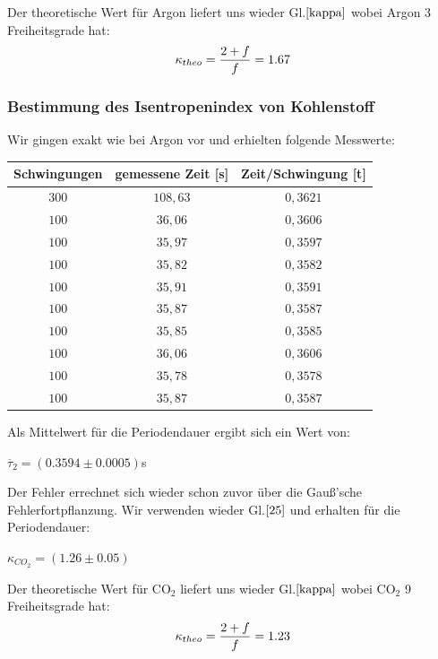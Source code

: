 \documentclass{article}
\begin{document}
{{Der theoretische Wert für Argon liefert uns wieder Gl.\(\eqref{kappa}\) wobei Argon 3 Freiheitsgrade hat:
\begin{equation}
\notag
\kappa_{theo} = \frac{2+f}{f} = 1.67
\end{equation}

\subsubsection{Bestimmung des Isentropenindex von Kohlenstoff}
Wir gingen exakt wie bei Argon vor und erhielten folgende Messwerte:
\begin{center}
\begin{tabular}{c|c|c}
Schwingungen & gemessene Zeit [s]& Zeit/Schwingung [t]\\
\hline 
\(300\)	& \(108,63\) & \(0,3621\)\\
\(100\)	& \(36,06\)	& \(0,3606\)\\
\(100\)	& \(35,97\)	& \(0,3597\)\\
\(100\)	& \(35,82\)	& \(0,3582\)\\
\(100\)	& \(35,91\)	& \(0,3591\)\\
\(100\)	& \(35,87\)	& \(0,3587\)\\
\(100\)	& \(35,85\)	& \(0,3585\)\\
\(100\)	& \(36,06\)	& \(0,3606\)\\
\(100\)	& \(35,78\)	& \(0,3578\)\\
\(100\)	& \(35,87\)	& \(0,3587\)\\
\end{tabular}
\end{center}

\vspace{1cm}

Als Mittelwert für die Periodendauer ergibt sich ein Wert von:
\begin{center}
\(\overline{\tau}_{2} = (0.3594 \pm 0.0005)\)s
\end{center}

Der Fehler errechnet sich wieder schon zuvor über die Gauß'sche Fehlerfortpflanzung.
Wir verwenden wieder Gl.\(\eqref{25}\) und erhalten für die Periodendauer:
\begin{center}
\(\kappa_{CO_2} = (1.26 \pm 0.05)\)
\end{center}

Der theoretische Wert für CO\(_2\) liefert uns wieder Gl.\(\eqref{kappa}\) wobei CO\(_2\) 9 Freiheitsgrade hat:
\begin{equation}
\notag
\kappa_{theo} = \frac{2+f}{f} = 1.23
\end{equation}

}}
\end{document}
